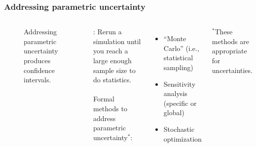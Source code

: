 \begin{frame}
    \frametitle{Addressing parametric uncertainty}

    \begin{columns}
        \column[t]{5cm}
        \begin{figure}
            \centering
            \resizebox{\columnwidth}{!}{
                
            }
            \caption{Addressing parametric uncertainty produces confidence intervals.}
            \label{fig:confidence-intervals}
        \end{figure}

        \column[t]{5cm}
        : Rerun a simulation until you reach a large enough sample size to do statistics.\\~\\
        Formal methods to address parametric uncertainty$^*$:
        \begin{itemize}
            \item ``Monte Carlo'' (i.e., statistical sampling)\pause
            \item Sensitivity analysis (specific or global)\pause
            \item Stochastic optimization\pause
        \end{itemize}


        \small{$^*$These methods are appropriate for  uncertainties.}
    \end{columns}

\end{frame}